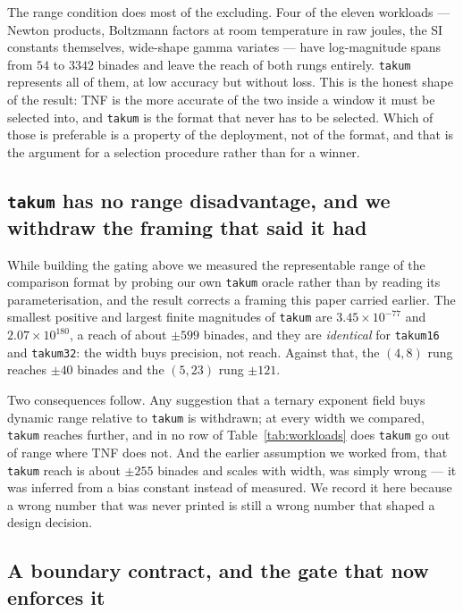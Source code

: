 \documentclass[11pt]{article}
\theoremstyle{definition}
\begin{document}
The range condition does most of the excluding. Four of the eleven workloads ---
Newton products, Boltzmann factors at room temperature in raw joules, the SI
constants themselves, wide-shape gamma variates --- have log-magnitude spans from
$54$ to $3342$ binades and leave the reach of both rungs entirely.
\texttt{takum} represents all of them, at low accuracy but without loss. This is
the honest shape of the result: TNF is the more accurate of the two inside a
window it must be selected into, and \texttt{takum} is the format that never has
to be selected. Which of those is preferable is a property of the deployment, not
of the format, and that is the argument for a selection procedure rather than for
a winner.

\subsection{\texttt{takum} has no range disadvantage, and we withdraw the framing that said it had}
\label{sec:takumrange}

While building the gating above we measured the representable range of the
comparison format by probing our own \texttt{takum} oracle rather than by reading
its parameterisation, and the result corrects a framing this paper carried
earlier. The smallest positive and largest finite magnitudes of \texttt{takum} are
$3.45 \times 10^{-77}$ and $2.07 \times 10^{180}$, a reach of about $\pm 599$
binades, and they are \emph{identical} for \texttt{takum16} and \texttt{takum32}:
the width buys precision, not reach. Against that, the $(4,8)$ rung reaches
$\pm 40$ binades and the $(5,23)$ rung $\pm 121$.

Two consequences follow. Any suggestion that a ternary exponent field buys
dynamic range relative to \texttt{takum} is withdrawn; at every width we compared,
\texttt{takum} reaches further, and in no row of Table~\ref{tab:workloads} does
\texttt{takum} go out of range where TNF does not. And the earlier assumption we
worked from, that \texttt{takum} reach is about $\pm 255$ binades and scales with
width, was simply wrong --- it was inferred from a bias constant instead of
measured. We record it here because a wrong number that was never printed is
still a wrong number that shaped a design decision.

\subsection{A boundary contract, and the gate that now enforces it}
\label{sec:boundarygate}
\end{document}
